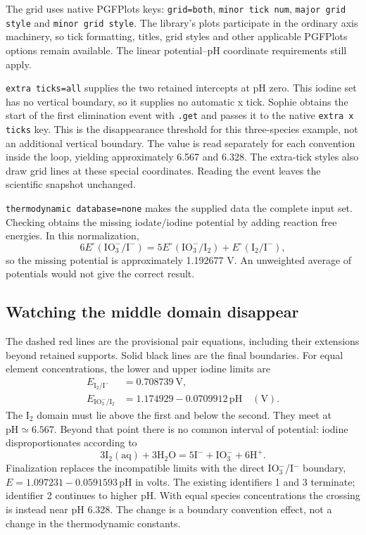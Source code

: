 \documentclass[a4paper,11pt]{ltxdoc}
\begin{document}
The grid uses native PGFPlots keys: \texttt{grid=both}, \texttt{minor tick num},
\texttt{major grid style} and \texttt{minor grid style}. The library's plots
participate in the ordinary axis machinery, so tick formatting, titles, grid
styles and other applicable PGFPlots options remain available. The linear
potential--pH coordinate requirements still apply.

\texttt{extra ticks=all} supplies the two retained intercepts at pH zero.
This iodine set has no vertical boundary, so it supplies no automatic x tick.
Sophie obtains the start of the first elimination event with \texttt{.get} and
passes it to the native \texttt{extra x ticks} key. This is the disappearance
threshold for this three-species example, not an additional vertical boundary.
The value is read separately for each convention inside the loop, yielding
approximately 6.567 and 6.328. The extra-tick styles also draw grid lines at these
special coordinates. Reading the event leaves the scientific snapshot unchanged.

\texttt{thermodynamic database=none} makes the supplied data the complete input
set. Checking obtains the missing iodate/iodine potential by adding reaction free
energies. In this normalization,
\[
 6E^\circ(\mathrm{IO_3^-/I^-})=
 5E^\circ(\mathrm{IO_3^-/I_2})+E^\circ(\mathrm{I_2/I^-}),
\]
so the missing potential is approximately 1.192677 V. An unweighted average of
potentials would not give the correct result.

\subsection{Watching the middle domain disappear}
The dashed red lines are the provisional pair equations, including their
extensions beyond retained supports. Solid black lines are the final boundaries.
For equal element concentrations, the lower and upper iodine limits are
\begin{align*}
 E_{\mathrm{I_2/I^-}}&=0.708739\ \mathrm V,\\
 E_{\mathrm{IO_3^-/I_2}}&=1.174929-0.0709912\,\mathrm{pH}\quad(\mathrm V).
\end{align*}
The I$_2$ domain must lie above the first and below the second. They meet at
$\mathrm{pH}\simeq6.567$. Beyond that point there is no common interval of
potential: iodine disproportionates according to
\[
 3\mathrm{I_2(aq)}+3\mathrm{H_2O}=
 5\mathrm{I^-}+\mathrm{IO_3^-}+6\mathrm{H^+}.
\]
Finalization replaces the incompatible limits with the direct IO$_3^-$/I$^-$
boundary, $E=1.097231-0.0591593\,\mathrm{pH}$ in volts. The existing identifiers
1 and 3 terminate; identifier 2 continues to higher pH. With equal species
concentrations the crossing is instead near pH 6.328. The change is a boundary
convention effect, not a change in the thermodynamic constants.
\end{document}
